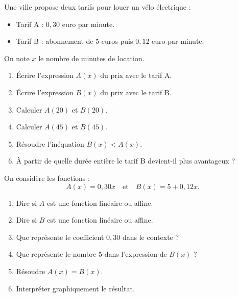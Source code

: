\begin{exercice}
Une ville propose deux tarifs pour louer un vélo électrique :
\begin{itemize}
  \item Tarif A : $0{,}30$ euro par minute.
  \item Tarif B : abonnement de $5$ euros puis $0{,}12$ euro par minute.
\end{itemize}

On note $x$ le nombre de minutes de location.

\begin{enumerate}
  \item Écrire l'expression $A(x)$ du prix avec le tarif A.
  \item Écrire l'expression $B(x)$ du prix avec le tarif B.
  \item Calculer $A(20)$ et $B(20)$.
  \item Calculer $A(45)$ et $B(45)$.
  \item Résoudre l'inéquation $B(x)<A(x)$.
  \item À partir de quelle durée entière le tarif B devient-il plus avantageux ?
\end{enumerate}
\end{exercice}

\begin{exercice}
On considère les fonctions :
\[
A(x)=0{,}30x
\quad \text{et} \quad
B(x)=5+0{,}12x.
\]

\begin{enumerate}
  \item Dire si $A$ est une fonction linéaire ou affine.
  \item Dire si $B$ est une fonction linéaire ou affine.
  \item Que représente le coefficient $0{,}30$ dans le contexte ?
  \item Que représente le nombre $5$ dans l'expression de $B(x)$ ?
  \item Résoudre $A(x)=B(x)$.
  \item Interpréter graphiquement le résultat.
\end{enumerate}
\end{exercice}

